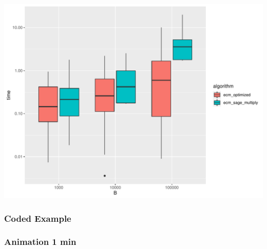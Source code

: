 \documentclass{beamer}
\begin{document}
\begin{frame}

\includegraphics[width=\textwidth]{graphs/ecm_perf.pdf}

\end{frame}

\begin{frame}
\frametitle{Coded Example}



\end{frame}

\begin{frame}
\frametitle{Animation 1 min}

\end{frame}
\end{document}
